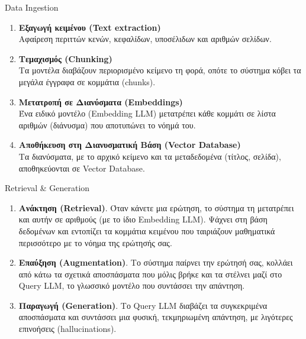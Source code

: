 \documentclass[aspectratio=169,11pt]{beamer}
\begin{document}
\begin{frame}{Data Ingestion}
	\small
  \begin{enumerate}
    \item \textbf{Εξαγωγή κειμένου (Text extraction)}\\
	Αφαίρεση περιττών κενών, κεφαλίδων, υποσέλιδων και αριθμών σελίδων.
    \item \textbf{Τεμαχισμός (Chunking)}\\
      Τα μοντέλα διαβάζουν περιορισμένο κείμενο τη φορά, οπότε το σύστημα
      κόβει τα μεγάλα έγγραφα σε κομμάτια (chunks).
    \item \textbf{Μετατροπή σε Διανύσματα (Embeddings)}\\
      Ένα ειδικό μοντέλο (Embedding LLM) μετατρέπει κάθε κομμάτι σε λίστα
      αριθμών (διάνυσμα) που αποτυπώνει το νόημά του.
    \item \textbf{Αποθήκευση στη Διανυσματική Βάση (Vector Database)}\\
      Τα διανύσματα, με το αρχικό κείμενο και τα μεταδεδομένα (τίτλος,
      σελίδα), αποθηκεύονται σε Vector Database.
  \end{enumerate}
\end{frame}

\begin{frame}{Retrieval \& Generation}
  \begin{enumerate}
    \item \textbf{Ανάκτηση (Retrieval)}. Όταν κάνετε μια ερώτηση, το σύστημα τη
      μετατρέπει και αυτήν σε αριθμούς (με το ίδιο Embedding LLM). Ψάχνει στη
      βάση δεδομένων και εντοπίζει τα κομμάτια κειμένου που ταιριάζουν
      μαθηματικά περισσότερο με το νόημα της ερώτησής σας.
    \item \textbf{Επαύξηση (Augmentation)}. Το σύστημα παίρνει την ερώτησή
      σας, κολλάει από κάτω τα σχετικά αποσπάσματα που μόλις βρήκε και τα
      στέλνει μαζί στο Query LLM, το γλωσσικό μοντέλο που συντάσσει την απάντηση.
    \item \textbf{Παραγωγή (Generation)}. Το Query LLM διαβάζει τα συγκεκριμένα
      αποσπάσματα και συντάσσει μια φυσική, τεκμηριωμένη απάντηση, με
      λιγότερες επινοήσεις (hallucinations).
  \end{enumerate}
\end{frame}
\end{document}
